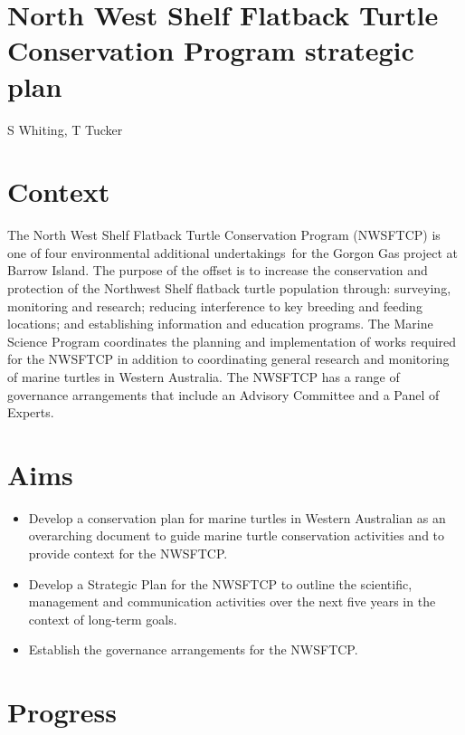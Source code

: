 \documentclass[version=last,
    paper=a4, %
    10pt, %
    usenames,
    dvipsnames,
    oneside, %
    headings=openany, %
    DIV=15 %
]{scrbook}
\begin{document}
\section*{North West Shelf Flatback Turtle Conservation Program strategic plan
}

S Whiting, T Tucker



\section*{Context}

The North West Shelf Flatback Turtle Conservation Program (NWSFTCP) is
one of four environmental additional undertakings~for the Gorgon Gas
project at Barrow Island. The purpose of the offset is to increase the
conservation and protection of the Northwest Shelf flatback turtle
population through: surveying, monitoring and research; reducing
interference to key breeding and feeding locations; and establishing
information and education programs. The Marine Science Program
coordinates the planning and implementation of works required for the
NWSFTCP in addition to coordinating general research and monitoring of
marine turtles in Western Australia. The NWSFTCP has a range of
governance arrangements that include an Advisory Committee and a Panel
of Experts.~




\section*{Aims}

\begin{itemize}
\itemsep1pt\parskip0pt
\item
  Develop a conservation plan for marine turtles in Western Australian
  as an overarching document to guide marine turtle conservation
  activities and to provide context for the NWSFTCP.
\item
  Develop a Strategic Plan for the NWSFTCP to outline the scientific,
  management and communication activities over the next five years in
  the context of long-term goals.
\item
  Establish the governance arrangements for the NWSFTCP.
\end{itemize}




\section*{Progress}
\end{document}
